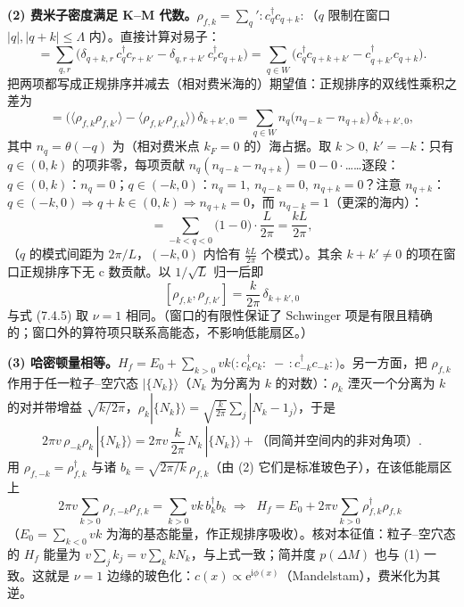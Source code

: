 \textbf{(2) 费米子密度满足 K--M 代数。}$\rho_{f,k}=\sum_q\!'\!:\!c_q^{\dagger}c_{q+k}\!:$（$q$ 限制在窗口 $|q|,|q+k|\leqslant\Lambda$ 内）。直接计算对易子：
\begin{equation*}
[\rho_{f,k},\rho_{f,k'}]=\sum_{q,r}
\big(\delta_{q+k,r}\,c_q^{\dagger}c_{r+k'}-\delta_{q,r+k'}\,c_r^{\dagger}c_{q+k}\big)
=\sum_{q\in W}\big(c_q^{\dagger}c_{q+k+k'}-c_{q+k'}^{\dagger}c_{q+k}\big).
\end{equation*}
把两项都写成正规排序并减去（相对费米海的）期望值：正规排序的双线性乘积之差为
\begin{equation*}
[\rho_{f,k},\rho_{f,k'}]=\Big(\langle\rho_{f,k}\rho_{f,k'}\rangle-\langle\rho_{f,k'}\rho_{f,k}\rangle\Big)\,\delta_{k+k',0}
=\sum_{q\in W}n_q\big(n_{q-k}-n_{q+k}\big)\,\delta_{k+k',0},
\end{equation*}
其中 $n_q=\theta(-q)$ 为（相对费米点 $k_F=0$ 的）海占据。取 $k>0,\ k'=-k$：只有 $q\in(0,k)$ 的项非零，每项贡献 $n_q(n_{q-k}-n_{q+k})=0-0\cdot$……逐段：$q\in(0,k)$：$n_q=0$；$q\in(-k,0)$：$n_q=1,\ n_{q-k}=0,\ n_{q+k}=0$？注意 $n_{q+k}$：$q\in(-k,0)\Rightarrow q+k\in(0,k)\Rightarrow n_{q+k}=0$，而 $n_{q-k}=1$（更深的海内）：
\begin{equation*}
[\rho_{f,k},\rho_{f,-k}]=\sum_{-k<q<0}\!\!\big(1-0\big)\cdot\frac{L}{2\pi}
=\frac{kL}{2\pi},
\end{equation*}
（$q$ 的模式间距为 $2\pi/L$，$(-k,0)$ 内恰有 $\frac{kL}{2\pi}$ 个模式）。其余 $k+k'\neq0$ 的项在窗口正规排序下无 c 数贡献。以 $1/\sqrt{L}$ 归一后即
\begin{equation*}
\boxed{\;[\rho_{f,k},\rho_{f,k'}]=\frac{k}{2\pi}\,\delta_{k+k',0}\;}
\end{equation*}
与式 (7.4.5) 取 $\nu=1$ 相同。（窗口的有限性保证了 Schwinger 项是有限且精确的；窗口外的算符项只联系高能态，不影响低能扇区。）

\textbf{(3) 哈密顿量相等。}$H_f=E_0+\sum_{k>0}vk\big(\!:\!c_k^{\dagger}c_k\!:\;-\,:\!c_{-k}^{\dagger}c_{-k}\!:\big)$。另一方面，把 $\rho_{f,k}$ 作用于任一粒子--空穴态 $|\{N_k\}\rangle$（$N_k$ 为分离为 $k$ 的对数）：$\rho_k$ 湮灭一个分离为 $k$ 的对并带增益 $\sqrt{k/2\pi}$，$\rho_k|\{N_k\}\rangle=\sqrt{\frac{k}{2\pi}}\sum_j|N_k-1_j\rangle$，于是
\begin{equation*}
2\pi v\,\rho_{-k}\rho_k\,|\{N_k\}\rangle
=2\pi v\,\frac{k}{2\pi}\,N_k\,|\{N_k\}\rangle+\text{（同简并空间内的非对角项）} .
\end{equation*}
用 $\rho_{f,-k}=\rho_{f,k}^{\dagger}$ 与诸 $b_k=\sqrt{2\pi/k}\,\rho_{f,k}$（由 (2) 它们是标准玻色子），在该低能扇区上
\begin{equation*}
2\pi v\sum_{k>0}\rho_{f,-k}\rho_{f,k}=\sum_{k>0}vk\,b_k^{\dagger}b_k
\;\Longrightarrow\;
\boxed{\;H_f=E_0+2\pi v\sum_{k>0}\rho_{f,k}^{\dagger}\rho_{f,k}\;}
\end{equation*}
（$E_0=\sum_{k<0}vk$ 为海的基态能量，作正规排序吸收）。核对本征值：粒子--空穴态的 $H_f$ 能量为 $v\sum_j k_j=v\sum_kkN_k$，与上式一致；简并度 $p(\Delta M)$ 也与 (1) 一致。这就是 $\nu=1$ 边缘的玻色化：$c(x)\propto\mathrm{e}^{\mathrm{i}\phi(x)}$（Mandelstam），费米化为其逆。

